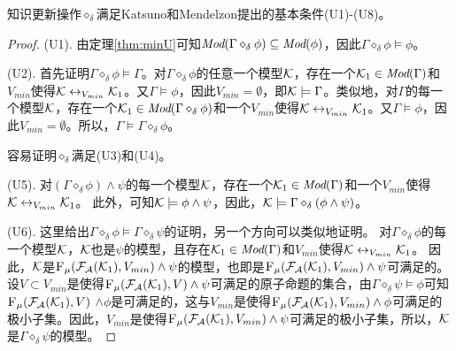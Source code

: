 \begin{theorem}\label{thm:U1toU8}
	知识更新操作$\diamond_{\delta}$满足Katsuno和Mendelzon提出的基本条件(U1)-(U8)。
\end{theorem}
\begin{proof}
	(U1). 由定理\ref{thm:minU}可知$\textit{Mod}(\Gamma \diamond_{\delta} \phi) \subseteq \textit{Mod}(\phi)$，因此$\Gamma \diamond_{\delta} \phi \models \phi$。
	
	 
	
	(U2). 首先证明$\Gamma \diamond_{\delta} \phi \models \Gamma$。对$\Gamma \diamond_{\delta} \phi$的任意一个模型${\cal K}$，存在一个${\cal K}_1 \in \textit{Mod}(\Gamma)$和 $V_{min}$使得${\cal K} \leftrightarrow_{V_{min}} {\cal K}_1$。又$\Gamma \models \phi$，因此$V_{min} = \emptyset$，即${\cal K} \models  \Gamma$。类似地，对$\Gamma$的每一个模型${\cal K}$，存在一个${\cal K}_1\in \textit{Mod}(\Gamma \diamond_{\delta} \phi)$和一个$V_{min}$使得${\cal K} \leftrightarrow_{V_{min}} {\cal K}_1$。又$\Gamma \models \phi$，因此$V_{min} = \emptyset$。所以，$\Gamma \models \Gamma \diamond_{\delta} \phi$。
	
	 
	
	容易证明$\diamond_{\delta}$满足(U3)和(U4)。
	
	(U5). 对$(\Gamma \diamond_{\delta} \phi) \wedge \psi$的每一个模型${\cal K}$，存在一个${\cal K}_1 \in \textit{Mod}(\Gamma)$和一个$V_{min}$使得${\cal K} \leftrightarrow_{V_{min}} {\cal K}_1$。
	此外，可知${\cal K} \models \phi \wedge \psi$，因此，${\cal K} \models \Gamma \diamond_{\delta} (\phi \wedge \psi)$。
	 
	(U6). 这里给出$\Gamma \diamond_{\delta} \phi \models \Gamma \diamond_{\delta} \psi$的证明，另一个方向可以类似地证明。
	对$\Gamma \diamond_{\delta} \phi$的每一个模型${\cal K}$，${\cal K}$也是$\psi$的模型，且存在${\cal K}_1 \in \textit{Mod}(\Gamma)$和$V_{min}$使得${\cal K} \leftrightarrow_{V_{min}} {\cal K}_1$。
	因此，${\cal K}$是${\textsc{F}_{\textsc{$\mu$}}}({\cal F}_{{\cal A}}({\cal K}_1), V_{min}) \wedge \psi$的模型，也即是${\textsc{F}_{\textsc{$\mu$}}}({\cal F}_{{\cal A}}({\cal K}_1), V_{min}) \wedge \psi$可满足的。
	设$V\subset V_{min}$是使得${\textsc{F}_{\textsc{$\mu$}}}({\cal F}_{{\cal A}}({\cal K}_1), V) \wedge \psi$可满足的原子命题的集合，由$\Gamma \diamond_{\delta} \psi \models \phi$可知${\textsc{F}_{\textsc{$\mu$}}}({\cal F}_{{\cal A}}({\cal K}_1), V)$ $\wedge \phi$是可满足的，这与$V_{min}$是使得${\textsc{F}_{\textsc{$\mu$}}}({\cal F}_{{\cal A}}({\cal K}_1), V_{min}) \wedge \phi$可满足的极小子集。因此，$V_{min}$是使得${\textsc{F}_{\textsc{$\mu$}}}({\cal F}_{{\cal A}}({\cal K}_1), V_{min}) \wedge \psi$可满足的极小子集，所以，${\cal K}$是$\Gamma \diamond_{\delta} \psi$的模型。
	

\end{proof}
